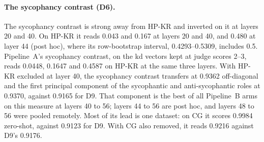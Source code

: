 \paragraph{The sycophancy contrast (D6).} The sycophancy contrast is strong away from HP-KR and inverted on it at layers 20 and 40. %
On HP-KR it reads 0.043 and 0.167 at layers 20 and 40, and 0.480 at layer 44 (post hoc), where its row-bootstrap interval, 0.4293--0.5309, includes 0.5. %
Pipeline~A's sycophancy contrast, on the kd vectors kept at judge scores 2--3, reads 0.0448, 0.1647 and 0.4587 on HP-KR at the same three layers. %
With HP-KR excluded at layer 40, the sycophancy contrast transfers at 0.9362 off-diagonal and the first principal component of the sycophantic and anti-sycophantic roles at 0.9370, against 0.9165 for D9. %
That component is the best of all Pipeline~B arms on this measure at layers 40 to 56; layers 44 to 56 are post hoc, and layers 48 to 56 were pooled remotely. %
Most of its lead is one dataset: on CG it scores 0.9984 zero-shot, against 0.9123 for D9. %
With CG also removed, it reads 0.9216 against D9's 0.9176. %

